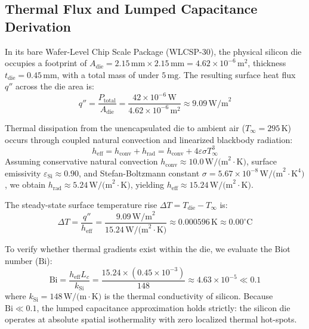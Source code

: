 \documentclass[10pt,twocolumn,letterpaper]{article}
\begin{document}
\subsection{Thermal Flux and Lumped Capacitance Derivation}

In its bare Wafer-Level Chip Scale Package (WLCSP-30), the physical silicon die occupies a footprint of $A_{\text{die}} = 2.15\,\text{mm} \times 2.15\,\text{mm} = 4.62 \times 10^{-6}\,\text{m}^2$, thickness $t_{\text{die}} = 0.45\,\text{mm}$, with a total mass of under $5\,\text{mg}$. The resulting surface heat flux $q''$ across the die area is:
\begin{equation}
q'' = \frac{P_{\text{total}}}{A_{\text{die}}} = \frac{42 \times 10^{-6}\,\text{W}}{4.62 \times 10^{-6}\,\text{m}^2} \approx 9.09\,\text{W/m}^2
\end{equation}

Thermal dissipation from the unencapsulated die to ambient air ($T_{\infty} = 295\,\text{K}$) occurs through coupled natural convection and linearized blackbody radiation:
\begin{equation}
h_{\text{eff}} = h_{\text{conv}} + h_{\text{rad}} = h_{\text{conv}} + 4 \varepsilon \sigma T_{\infty}^3
\end{equation}
Assuming conservative natural convection $h_{\text{conv}} \approx 10.0\,\text{W/(m}^2\cdot\text{K)}$, surface emissivity $\varepsilon_{\text{Si}} \approx 0.90$, and Stefan-Boltzmann constant $\sigma = 5.67 \times 10^{-8}\,\text{W/(m}^2\cdot\text{K}^4)$, we obtain $h_{\text{rad}} \approx 5.24\,\text{W/(m}^2\cdot\text{K)}$, yielding $h_{\text{eff}} \approx 15.24\,\text{W/(m}^2\cdot\text{K)}$.

The steady-state surface temperature rise $\Delta T = T_{\text{die}} - T_{\infty}$ is:
\begin{equation}
\Delta T = \frac{q''}{h_{\text{eff}}} = \frac{9.09\,\text{W/m}^2}{15.24\,\text{W/(m}^2\cdot\text{K)}} \approx 0.000596\,\text{K} \approx 0.00^{\circ}\text{C}
\end{equation}

To verify whether thermal gradients exist within the die, we evaluate the Biot number ($\text{Bi}$):
\begin{equation}
\text{Bi} = \frac{h_{\text{eff}} L_c}{k_{\text{Si}}} = \frac{15.24 \times (0.45 \times 10^{-3})}{148} \approx 4.63 \times 10^{-5} \ll 0.1
\end{equation}
where $k_{\text{Si}} = 148\,\text{W/(m}\cdot\text{K)}$ is the thermal conductivity of silicon. Because $\text{Bi} \ll 0.1$, the lumped capacitance approximation holds strictly: the silicon die operates at absolute spatial isothermality with zero localized thermal hot-spots.
\end{document}
